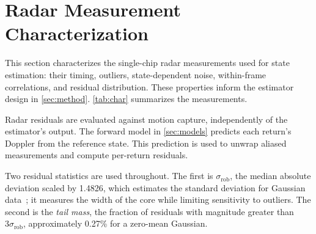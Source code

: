 \section{Radar Measurement Characterization}
\label{sec:char}

This section characterizes the single-chip radar measurements used
for state estimation: their timing, outliers, state-dependent noise,
within-frame correlations, and residual distribution.  These properties
inform the estimator design in \autoref{sec:method}.
\autoref{tab:char} summarizes the measurements.

Radar residuals are evaluated against motion capture, independently
of the estimator's output.  The forward model in \autoref{sec:models}
predicts each return's Doppler from the reference state. This prediction
is used to unwrap aliased measurements and compute per-return residuals.

Two residual statistics are used throughout.  The first is
$\sigma_{\mathrm{rob}}$, the median absolute deviation scaled by
1.4826, which estimates the standard deviation for
Gaussian data~\cite{rousseeuw1993alternatives}; it measures the width
of the core while limiting sensitivity to outliers.  The second is the
\emph{tail mass}, the fraction of residuals with magnitude greater than
$3\sigma_{\mathrm{rob}}$, approximately 0.27\% for a zero-mean Gaussian.

